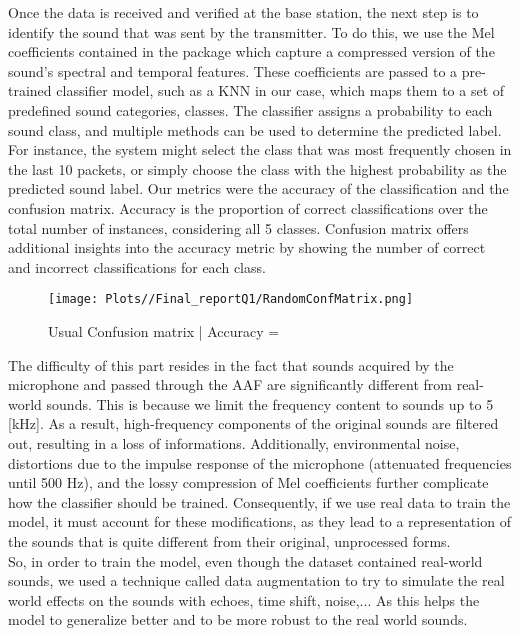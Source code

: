 \documentclass{article}
\begin{document}
Once the data is received and verified at the base station, the next step is to identify the sound that was sent by the transmitter. To do this, we use the Mel coefficients contained in the package which capture a compressed version of the sound's spectral and temporal features. These coefficients are passed to a pre-trained classifier model, such as a KNN in our case, which maps them to a set of predefined sound categories, classes. The classifier assigns a probability to each sound class, and multiple methods can be used to determine the predicted label. For instance, the system might select the class that was most frequently chosen in the last 10 packets, or simply choose the class with the highest probability as the predicted sound label.
Our metrics were the accuracy of the classification and the confusion matrix. Accuracy is the proportion of correct classifications over the total number of instances, considering all 5 classes. Confusion matrix offers additional insights into the accuracy metric by showing the number of correct and incorrect classifications for each class.
\begin{figure}[h]
    \centering
      \texttt{[image: Plots//Final\_reportQ1/RandomConfMatrix.png]}
      \caption{Usual Confusion matrix | Accuracy = }
\end{figure}

The difficulty of this part resides in the fact that sounds acquired by the microphone and passed through the AAF are significantly different from real-world sounds. This is because we limit the frequency content to sounds up to 5 [kHz]. As a result, high-frequency components of the original sounds are filtered out, resulting in a loss of informations. Additionally, environmental noise, distortions due to the impulse response of the microphone (attenuated frequencies until 500 Hz), and the lossy compression of Mel coefficients further complicate how the classifier should be trained. Consequently, if we use real data to train the model, it must account for these modifications, as they lead to a representation of the sounds that is quite different from their original, unprocessed forms.\\

So, in order to train the model, even though the dataset contained real-world sounds, we used a technique called data augmentation to try to 
simulate the real world effects on the sounds with echoes, time shift, noise,... As this helps the model to generalize better and to be more robust to the real world sounds.
\end{document}

